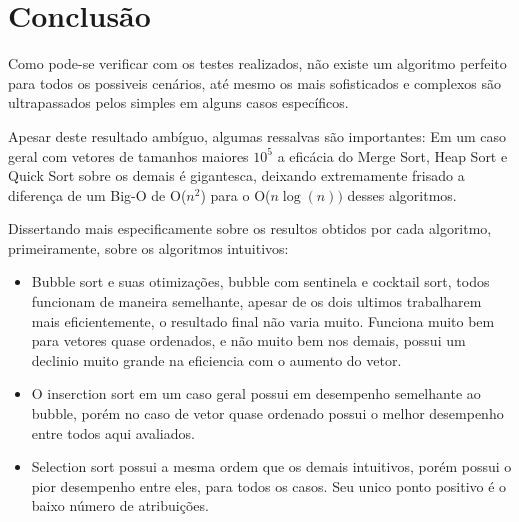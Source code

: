 \chapter{Conclusão}
\label{chap:conclusao}

Como pode-se verificar com os testes realizados, não existe um algoritmo perfeito para todos os possiveis cenários, até mesmo os mais sofisticados e complexos são ultrapassados pelos simples em alguns casos específicos.

Apesar deste resultado ambíguo, algumas ressalvas são importantes: Em um caso geral com vetores de tamanhos maiores $10^5$ a eficácia do Merge Sort, Heap Sort e Quick Sort sobre os demais é gigantesca, deixando extremamente frisado a diferença de um Big-O de O($n^2$) para o O($n\log(n))$ desses algoritmos.

Dissertando mais especificamente sobre os resultos obtidos por cada algoritmo, primeiramente, sobre os algoritmos intuitivos:

\begin{itemize}
   \item Bubble sort e suas otimizações, bubble com sentinela e cocktail sort, todos funcionam de maneira semelhante, apesar de os dois ultimos trabalharem mais eficientemente, o resultado final não varia muito. Funciona muito bem para vetores quase ordenados, e não muito bem nos demais, possui um declinio muito grande na eficiencia com o aumento do vetor.
   
   \item O inserction sort em um caso geral possui em desempenho semelhante ao bubble, porém no caso de vetor quase ordenado possui o melhor desempenho entre todos aqui avaliados.
   
   \item Selection sort possui a mesma ordem que os demais intuitivos, porém possui o pior desempenho entre eles, para todos os casos. Seu unico ponto positivo é o baixo número de atribuições.
   
\end{itemize}
   
